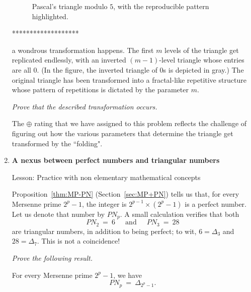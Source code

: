 \begin{enumerate}
{\begin{figure}[ht]
\begin{center}
        \caption{Pascal's triangle modulo $5$, with the reproducible pattern highlighted.}
        \label{fig:TriangleModulo5shade}
\end{center}
\end{figure}
*******************}
a wondrous transformation happens.  The first $m$ levels of the triangle get replicated endlessly, with an inverted $(m-1)$-level triangle whose entries are all $0$.  (In the figure, the inverted triangle of $0$s is depicted in gray.)  The original triangle has been transformed into a fractal-like repetitive structure whose pattern of repetitions is dictated by the parameter $m$.

\medskip

{\em Prove that the described transformation occurs.}

\smallskip

The $\oplus$ rating that we have assigned to this problem reflects the challenge of figuring out how the various parameters that determine the triangle get transformed by the ``folding".

\medskip\item
{\bf A nexus between perfect numbers and triangular numbers}

{\sc Lesson:} Practice with non elementary mathematical concepts

\smallskip

Proposition~\ref{thm:MP-PN} (Section~\ref{sec:MP+PN}) tells us that, for every Mersenne prime $2^p-1$, the integer is $2^{p-1} \times (2^p-1)$ is a perfect number.  Let us denote that number by $PN_p$.  A small calculation verifies that both
\[ PN_2 \ = \ 6 \ \ \ \ \ \mbox{ and } \ \ \ \ \ PN_3 \ = \ 28 \]
are triangular numbers, in addition to being perfect; to wit, $6 =\Delta_3$ and $28=\Delta_7$.  This is not a coincidence!

\smallskip

{\em Prove the following result.}

\begin{prop}
For every Mersenne prime $2^p-1$, we have
\[ PN_p \ = \  \Delta_{2^p-1}. \]
\end{prop}


\end{enumerate}
